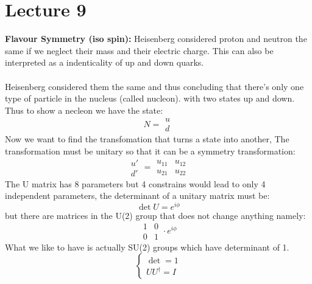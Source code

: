 \documentclass[10pt,a4paper]{article}
\begin{document}
     \section{Lecture 9}
     \textbf{Flavour Symmetry (iso spin): } Heisenberg considered proton and neutron the same if we neglect their mass and their electric charge. This can also be interpreted as a indenticality of up and down quarks. 
     \\
     \\
     Heisenberg considered them the same and thus concluding that there's only one type of particle in the nucleus (called nucleon).  with two states up and down. Thus to show a necleon we have the state:
     $$
     N = \begin{matrix} u \\ d\end{matrix}
     $$
     Now we want to find the transfomation that turns a state into another, The transformation must be unitary so that it can be a symmetry transformation:
     \begin{equation}
          \begin{matrix} u' \\ d' \end{matrix} = \begin{matrix} u_{11} & u_{12} \\ u_{21} & u_{22} \end{matrix}
     \end{equation}
     The U matrix has 8 parameters but 4 constrains would lead to only 4 independent parameters, the determinant of a unitary matrix must be:
     \begin{equation}
          \det U = e^{i\phi}
     \end{equation}
     but there are matrices in the U(2) group that does not change anything namely:
     $$
     \begin{matrix}
          1 & 0 \\
          0 & 1
     \end{matrix}\cdot e^{i\phi}
     $$
     What we like to have is actually SU(2) groups which have determinant of 1.
     \begin{equation}
          \left\{ \begin{matrix} \det =1\\
               UU^\dagger = I
          \end{matrix}\right.
     \end{equation}
\end{document}
